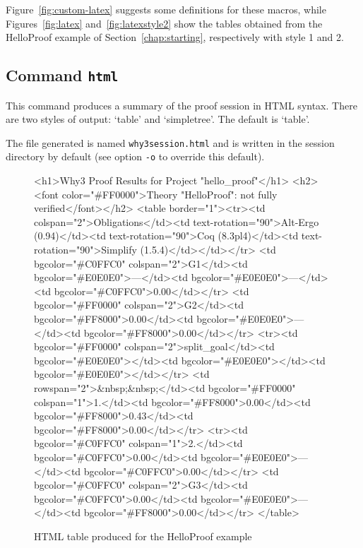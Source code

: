 Figure~\ref{fig:custom-latex} suggests some definitions for these
macros, while Figures~\ref{fig:latex} and~\ref{fig:latexstyle2} show
the tables obtained from the HelloProof example of
Section~\ref{chap:starting}, respectively with style 1 and 2.

\subsection{Command \texttt{html}}

This command produces a summary of the proof session in HTML syntax.
There are two styles of output: `table' and `simpletree'. The default is
`table'.

The file generated is named \texttt{why3session.html} and is written
in the session directory by default (see option \texttt{-o} to
override this default).

\begin{figure}[t]
\begin{center}
\end{center}
\begin{htmlonly}
\begin{rawhtml}
<h1>Why3 Proof Results for Project "hello_proof"</h1>
<h2><font color="#FF0000">Theory "HelloProof": not fully verified</font></h2>
<table border="1"><tr><td colspan="2">Obligations</td><td text-rotation="90">Alt-Ergo (0.94)</td><td text-rotation="90">Coq (8.3pl4)</td><td text-rotation="90">Simplify (1.5.4)</td></td></tr>
<td bgcolor="#C0FFC0" colspan="2">G1</td><td bgcolor="#E0E0E0">---</td><td bgcolor="#E0E0E0">---</td><td bgcolor="#C0FFC0">0.00</td></tr>
<td bgcolor="#FF0000" colspan="2">G2</td><td bgcolor="#FF8000">0.00</td><td bgcolor="#E0E0E0">---</td><td bgcolor="#FF8000">0.00</td></tr>
<tr><td bgcolor="#FF0000" colspan="2">split_goal</td><td bgcolor="#E0E0E0"></td><td bgcolor="#E0E0E0"></td><td bgcolor="#E0E0E0"></td></tr>
<td rowspan="2">&nbsp;&nbsp;</td><td bgcolor="#FF0000" colspan="1">1.</td><td bgcolor="#FF8000">0.00</td><td bgcolor="#FF8000">0.43</td><td bgcolor="#FF8000">0.00</td></tr>
<tr><td bgcolor="#C0FFC0" colspan="1">2.</td><td bgcolor="#C0FFC0">0.00</td><td bgcolor="#E0E0E0">---</td><td bgcolor="#C0FFC0">0.00</td></tr>
<td bgcolor="#C0FFC0" colspan="2">G3</td><td bgcolor="#C0FFC0">0.00</td><td bgcolor="#E0E0E0">---</td><td bgcolor="#FF8000">0.00</td></tr>
</table>
\end{rawhtml}
\end{htmlonly}
\caption{HTML table produced for the HelloProof example}
\label{fig:html}
\end{figure}

